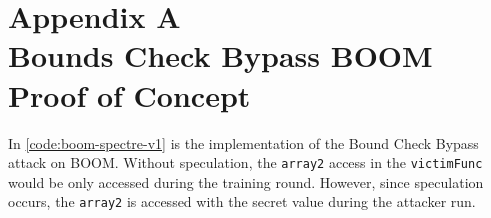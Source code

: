 \section*{Appendix A\\
          Bounds Check Bypass BOOM Proof of Concept}

In \ref{code:boom-spectre-v1} is the implementation of the Bound Check Bypass attack
on BOOM. Without speculation, the {\tt array2} access in the {\tt victimFunc} would be only accessed
during the training round. However, since speculation occurs, the {\tt array2} is accessed with
the secret value during the attacker run.

\onecolumn

\label{code:boom-spectre-v1}

